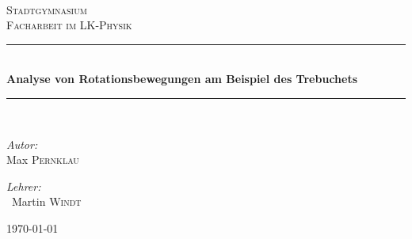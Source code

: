 \newcommand{\HRule}{\rule{\linewidth}{0.5mm}}

\begin{titlepage}
\begin{center}

~\\[1cm]

\textsc{\LARGE Stadtgymnasium}\\[1.5cm]

\textsc{\Large Facharbeit im LK-Physik}\\[0.5cm]

\HRule \\[0.4cm]
{ \huge \bfseries Analyse von Rotationsbewegungen am Beispiel des Trebuchets}\\[0.4cm]

\HRule \\[1.5cm]

\begin{minipage}{0.4\textwidth}
\begin{flushleft} \large
\emph{Autor:}\\
Max \textsc{Pernklau}
\end{flushleft}
\end{minipage}
\begin{minipage}{0.4\textwidth}
\begin{flushright} \large
\emph{Lehrer:} \\
~Martin \textsc{Windt}
\end{flushright}
\end{minipage}

\vfill

{\large \today}

\end{center}
\end{titlepage}